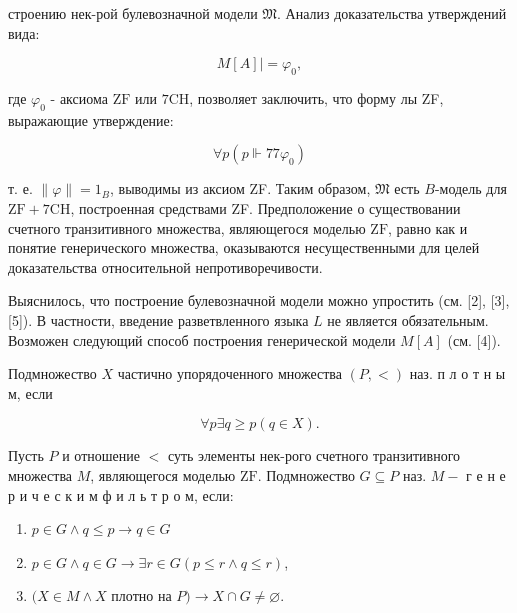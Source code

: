 \documentclass[10pt]{article}
\begin{document}
строению нек-рой булевозначной модели $\mathfrak{M}$. Анализ доказательства утверждений вида:



\[

M[A] \mid=\varphi_{0},

\]



где $\varphi_{0}$ - аксиома $\mathrm{ZF}$ или $7 \mathrm{CH}$, позволяет заключить, что форму лы ZF, выражающие утверждение:



\[

\forall p\left(p \Vdash 77 \varphi_{0}\right)

\]



т. е. $\|\varphi\|=1_{B}$, выводимы из аксиом ZF. Таким образом, $\mathfrak{M}$ есть $B$-модель для $\mathrm{ZF}+7 \mathrm{CH}$, построенная средствами ZF. Предположение о существовании счетного транзитивного множества, являющегося моделью $\mathrm{ZF}$, равно как и понятие генерического множества, оказываются несущественными для целей доказательства относительной непротиворечивости.



Выяснилось, что построение булевозначной модели можно упростить (см. [2], [3], [5]). В частности, введение разветвленного языка $L$ не является обязательным. Возможен следующий способ построения генерической модели $M[A]$ (см. [4]).



Подмножество $X$ частично упорядоченного множества $(P,<)$ наз. п л о т н ы м, если



\[

\forall p \exists q \geqslant p(q \in X) .

\]



Пусть $P$ и отношение $<$ суть элементы нек-рого счетного транзитивного множества $M$, являющегося моделью $\mathrm{ZF}$. Подмножество $G \subseteq P$ наз. $M-$ г е н е р и ч е с к и м ф и л ь т р о м, если:



\begin{enumerate}

  \item $p \in G \wedge q \leqslant p \rightarrow q \in G$



  \item $p \in G \wedge q \in G \rightarrow \exists r \in G(p \leqslant r \wedge q \leqslant r)$,



  \item $(X \in M \wedge X$ плотно на $P) \rightarrow X \cap G \neq \varnothing$.



\end{enumerate}
\end{document}
